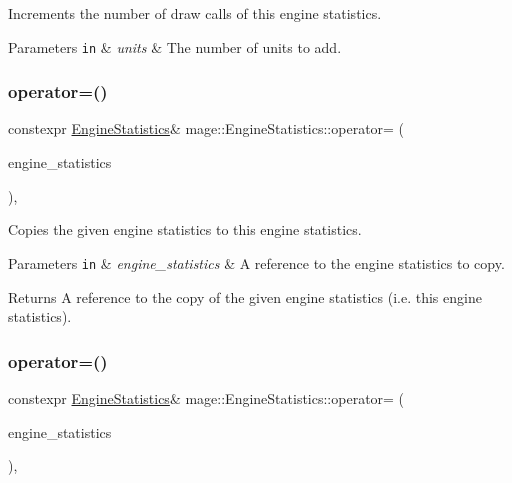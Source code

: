 Increments the number of draw calls of this engine statistics.


\begin{DoxyParams}[1]{Parameters}
\mbox{\tt in}  & {\em units} & The number of units to add. \\
\hline
\end{DoxyParams}
\hypertarget{classmage_1_1_engine_statistics_aad037dd90928e14e810b53de66e7cd80}{}\label{classmage_1_1_engine_statistics_aad037dd90928e14e810b53de66e7cd80} 
\subsubsection{\texorpdfstring{operator=()}{operator=()}\hspace{0.1cm}{\footnotesize\ttfamily [1/2]}}
{\footnotesize\ttfamily constexpr \hyperlink{classmage_1_1_engine_statistics}{Engine\+Statistics}\& mage\+::\+Engine\+Statistics\+::operator= (\begin{DoxyParamCaption}\item[{const \hyperlink{classmage_1_1_engine_statistics}{Engine\+Statistics} \&}]{engine\+\_\+statistics }\end{DoxyParamCaption})\hspace{0.3cm}{\ttfamily [default]}, {\ttfamily [noexcept]}}

Copies the given engine statistics to this engine statistics.


\begin{DoxyParams}[1]{Parameters}
\mbox{\tt in}  & {\em engine\+\_\+statistics} & A reference to the engine statistics to copy. \\
\hline
\end{DoxyParams}
\begin{DoxyReturn}{Returns}
A reference to the copy of the given engine statistics (i.\+e. this engine statistics). 
\end{DoxyReturn}
\hypertarget{classmage_1_1_engine_statistics_a01cddf6fa3409e1dbd07b6d0055d1fcc}{}\label{classmage_1_1_engine_statistics_a01cddf6fa3409e1dbd07b6d0055d1fcc} 
\subsubsection{\texorpdfstring{operator=()}{operator=()}\hspace{0.1cm}{\footnotesize\ttfamily [2/2]}}
{\footnotesize\ttfamily constexpr \hyperlink{classmage_1_1_engine_statistics}{Engine\+Statistics}\& mage\+::\+Engine\+Statistics\+::operator= (\begin{DoxyParamCaption}\item[{\hyperlink{classmage_1_1_engine_statistics}{Engine\+Statistics} \&\&}]{engine\+\_\+statistics }\end{DoxyParamCaption})\hspace{0.3cm}{\ttfamily [default]}, {\ttfamily [noexcept]}}

